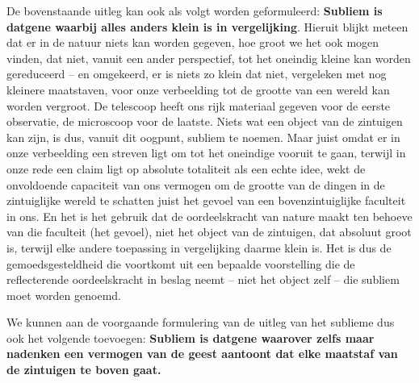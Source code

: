 De bovenstaande uitleg kan ook als volgt worden geformuleerd: \textbf{Subliem is datgene waarbij alles anders klein is in vergelijking}. Hieruit blijkt meteen dat er in de natuur niets kan worden gegeven, hoe groot we het ook mogen vinden, dat niet, vanuit een ander perspectief, tot het oneindig kleine kan worden gereduceerd – en omgekeerd, er is niets zo klein dat niet, vergeleken met nog kleinere maatstaven, voor onze verbeelding tot de grootte van een wereld kan worden vergroot. De telescoop heeft ons rijk materiaal gegeven voor de eerste observatie, de microscoop voor de laatste. Niets wat een object van de zintuigen kan zijn, is dus, vanuit dit oogpunt, subliem te noemen.
Maar juist omdat er in onze verbeelding een streven ligt om tot het oneindige vooruit te gaan, terwijl in onze rede een claim ligt op absolute totaliteit als een echte idee, wekt de onvoldoende capaciteit van ons vermogen om de grootte van de dingen in de zintuiglijke wereld te schatten juist het gevoel van een bovenzintuiglijke faculteit in ons. En het is het gebruik dat de oordeelskracht van nature maakt ten behoeve van die faculteit (het gevoel), niet het object van de zintuigen, dat absoluut groot is, terwijl elke andere toepassing in vergelijking daarme klein is. Het is dus de gemoedsgesteldheid die voortkomt uit een bepaalde voorstelling die de reflecterende oordeelskracht in beslag neemt – niet het object zelf – die subliem moet worden genoemd.

We kunnen aan de voorgaande formulering van de uitleg van het sublieme dus ook het volgende toevoegen: \textbf{Subliem is datgene waarover zelfs maar nadenken een vermogen van de geest aantoont dat elke maatstaf van de zintuigen te boven gaat.}

